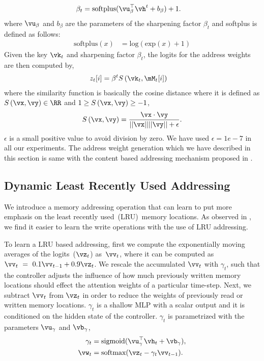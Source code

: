\documentclass[12pt]{article}
\begin{document}
\begin{align}
    \beta_t &= \text{softplus}(\vu_{\beta}^{\top} \vh^t + b_{\beta}) + 1.
\end{align}
where $\vu_{\beta}$ and $b_{\beta}$ are the parameters of the sharpening factor $\beta_t$ and softplus is defined as follows:
\begin{align}
\text{softplus}(x) &= \text{log}(\text{exp}(x) + 1)
\end{align}
Given the key $\vk_t$ and sharpening factor $\beta_t$, the logits for the address weights are then computed by,
\begin{align}
 z_t[i] & = \beta^t S\left(\vk_t, \mM_t[i]\right)
\end{align}
where the similarity function is basically the cosine distance where it is defined as $S\left(\vx, \vy\right) \in \RR$ and $1 \ge S\left(\vx, \vy\right) \ge -1$,
\[
    S\left(\vx, \vy\right) = \frac{\vx \cdot \vy}{||\vx||||\vy|| + \epsilon}.
\]
$\epsilon$ is a small positive value to avoid division by zero. We have used $\epsilon=1e-7$ in all our experiments. The address weight generation which we have described in this section is same with the content based addressing mechanism proposed in \citep{graves2014neural}. 


\subsection{Dynamic Least Recently Used Addressing}

We introduce a memory addressing operation that can learn to put more emphasis on the 
least recently used~(LRU)~memory locations. As observed in \citep{santoro2016one, dmnew},
we find it easier to learn the write operations with the use of LRU addressing.

To learn a LRU based addressing, first we compute the exponentially moving averages of the logits~($\vz_t$) as~$\vv_t$, where it can be computed as~$\vv_t~=~0.1 \vv_{t-1} + 0.9 \vz_{t}$. We rescale the accumulated $\vv_t$ with $\gamma_t$, such that the controller adjusts the influence of how much previously written memory locations should effect the attention weights of a particular time-step. Next, we subtract $\vv_t$ from $\vz_t$ in order to reduce the weights of previously read or written memory locations. $\gamma_t$ is a shallow MLP with a scalar output and it is conditioned on the hidden state of the controller. $\gamma_t$ is parametrized with the parameters $\vu_{\gamma}$ and $\vb_{\gamma}$,
\begin{align}
       \gamma_t &= \text{sigmoid}(\vu_{\gamma}^{\top} \vh_t + \vb_{\gamma}),\\
       \vw_t &= \text{softmax}(\vz_t - \gamma_t \vv_{t-1}).  \label{eq:softmax}
\end{align}
\end{document}
